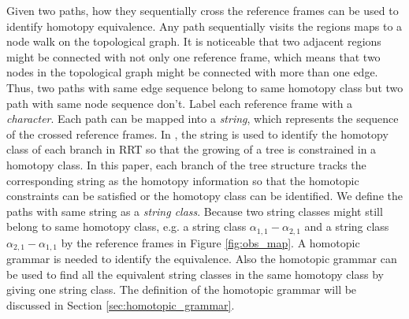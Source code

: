 \documentclass[letterpaper, 10 pt, conference]{ieeeconf}
\begin{document}
Given two paths, how they sequentially cross the reference frames can be used to identify homotopy equivalence.
Any path sequentially visits the regions maps to a node walk on the topological graph.
It is noticeable that two adjacent regions might be connected with not only one reference frame, which means that two nodes in the topological graph might be connected with more than one edge.
Thus, two paths with same edge sequence belong to same homotopy class but two path with same node sequence don't.  
Label each reference frame with a \emph{character}.
Each path can be mapped into a {\em string}, which represents the sequence of the crossed reference frames.
In \cite{Hernandez201544}, the string is used to identify the homotopy class of each branch in RRT so that the growing of a tree is constrained in a homotopy class.
In this paper, each branch of the tree structure tracks the corresponding string as the homotopy information so that the homotopic constraints can be satisfied or the homotopy class can be identified.
We define the paths with same string as a \emph{string class}.
Because two string classes might still belong to same homotopy class, e.g. a string class $ \alpha_{1,1}-\alpha_{2,1} $ and a string class $ \alpha_{2,1}-\alpha_{1,1} $ by the reference frames in Figure \ref{fig:obs_map}.
A homotopic grammar is needed to identify the equivalence.
Also the homotopic grammar can be used to find all the equivalent string classes in the same homotopy class by giving one string class.
The definition of the homotopic grammar will be discussed in Section \ref{sec:homotopic_grammar}.



\end{document}
